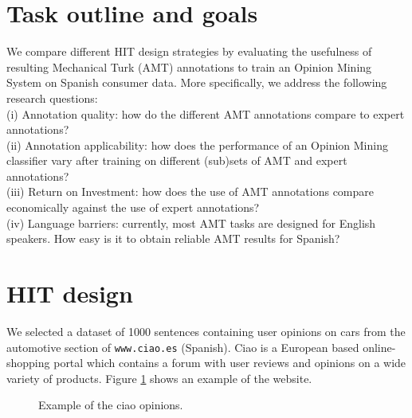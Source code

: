 \documentclass[11pt, a4paper,onecolumn]{article}
\begin{document}
\section{Task outline and goals}
\label{sect:outline} 

We compare different HIT design strategies by evaluating the usefulness of resulting Mechanical Turk (AMT) annotations to train an Opinion Mining System on Spanish consumer data. More specifically, we address the following research questions:\\
 \indent (i) Annotation quality: how do the different AMT annotations compare to expert annotations?\\
 \indent (ii) Annotation applicability: how does the performance of an Opinion Mining classifier vary after training on different (sub)sets of AMT and expert annotations?\\
 \indent (iii) Return on Investment: how does the use of AMT annotations compare economically against the use of expert annotations?\\
 \indent (iv) Language barriers: currently, most AMT tasks are designed for English speakers. How easy is it to obtain reliable AMT results for Spanish? 

\section{HIT design}
\label{sect:design}

We selected a dataset of 1000 sentences containing user opinions on cars from the automotive section of \texttt{www.ciao.es} (Spanish). Ciao is a European based online-shopping portal which contains a forum with user reviews and opinions on a wide variety of products. Figure \ref{ciao} shows an example of the website. 

\begin{figure}[ht]
  \begin{center}
	\caption{Example of the ciao opinions.}
	\label{ciao}
  \end{center}
\end{figure}
\end{document}

